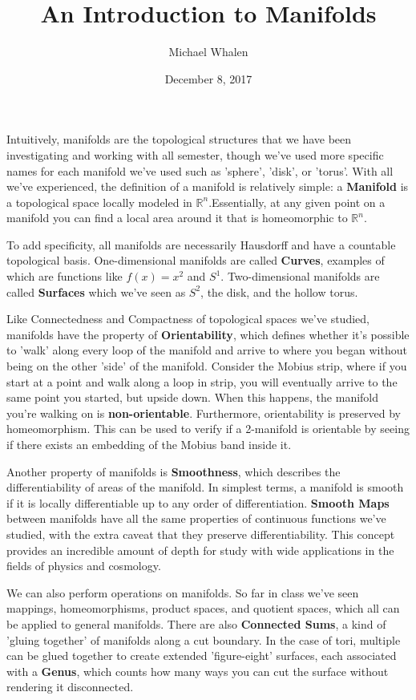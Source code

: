 \documentclass[letterpaper,12pt]{article}
\begin{document}
\title{An Introduction to Manifolds}
\author{Michael Whalen}
\date{December 8, 2017}
\maketitle


Intuitively, manifolds are the topological structures that we have been investigating and working with all semester, though we've used more specific names for each manifold we've used such as 'sphere', 'disk', or 'torus'. With all we've experienced, the definition of a manifold is relatively simple: a \textbf{Manifold} is a topological space locally modeled in $\mathbb{R}^{n}$.\cite[p.109]{Thurston}Essentially, at any given point on a manifold you can find a local area around it that is homeomorphic to $\mathbb{R}^{n}$. 

To add specificity, all manifolds are necessarily Hausdorff and have a countable topological basis. One-dimensional manifolds are called \textbf{Curves}, examples of which are functions like $f(x) = x^{2}$ and $S^{1}$. Two-dimensional manifolds are called \textbf{Surfaces} which we've seen as $S^{2}$, the disk, and the hollow torus. 

Like Connectedness and Compactness of topological spaces we've studied, manifolds have the property of \textbf{Orientability}, which defines whether it's possible to 'walk' along every loop of the manifold and arrive to where you began without being on the other 'side' of the manifold. Consider the Mobius strip, where if you start at a point and walk along a loop in strip, you will eventually arrive to the same point you started, but upside down. When this happens, the manifold you're walking on is \textbf{non-orientable}. Furthermore, orientability is preserved by homeomorphism. This can be used to verify if a 2-manifold is orientable by seeing if there exists an embedding of the Mobius band inside it. 

Another property of manifolds is \textbf{Smoothness}, which describes the differentiability of areas of the manifold. In simplest terms, a manifold is smooth if it is locally differentiable up to any order of differentiation. \textbf{Smooth Maps} between manifolds have all the same properties of continuous functions we've studied, with the extra caveat that they preserve differentiability. \cite[p.61]{Tu} This concept provides an incredible amount of depth for study with wide applications in the fields of physics and cosmology.

We can also perform operations on manifolds. So far in class we've seen mappings, homeomorphisms, product spaces, and quotient spaces, which all can be applied to general manifolds. There are also \textbf{Connected Sums}, a kind of 'gluing together' of manifolds along a cut boundary. In the case of tori, multiple can be glued together to create extended 'figure-eight' surfaces, each associated with a \textbf{Genus}, which counts how many ways you can cut the surface without rendering it disconnected.
\end{document}
